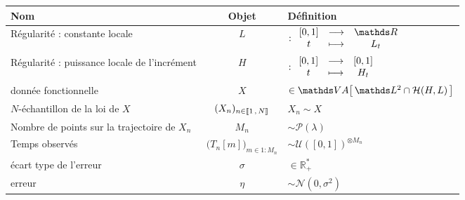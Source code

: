 \begin{figure}[H]
	\noindent\begin{tabularx}{\textwidth}{XcX}
		\toprule
		\textbf{Nom}                                 & \textbf{Objet}                              & \textbf{Définition}                                                                                                \\
		\midrule
		Régularité : constante locale                & $L$                                         & $: \func{[0,1]}{\mathds R}{t}{L_t}$                                                                                \\
		Régularité : puissance locale de l'incrément & $H$                                         & $: \begin{array}{ccc} [0,1] &\longrightarrow& [0,1] \\ t &\longmapsto& H_t \end{array}$                                                                                    \\
		donnée fonctionnelle                         & $X$                                         & $\in \VA{ \mathds L^2 \cap \mathcal H(H, L) }$                                                                     \\
		$N$-échantillon de la loi de $X$             & $(X_n)_{n \in \llbracket 1 \, , \, N \rrbracket}$           & $X_n \sim X$                                                                                                       \\
		\midrule
		Nombre de points sur la trajectoire de $X_n$ & $M_n$                                       & $\sim \mathcal P(\lambda)$                                                                                         \\
		Temps observés                               & $\bigl(T_n[m]\bigr)_{m \in 1:M_n}$          & $\sim \mathcal U( [0,1] )^{\otimes M_n}$                                                                           \\
		\midrule
		écart type de l'erreur                       & $\sigma$                                    & $\in \mathds R_+^*$                                                                                                \\
		erreur                                       & $\eta$                                      & $\sim \mathcal N(0, \sigma^2)$                                                                                     \\
		\bottomrule
		\end{tabularx}
		\end{figure}
